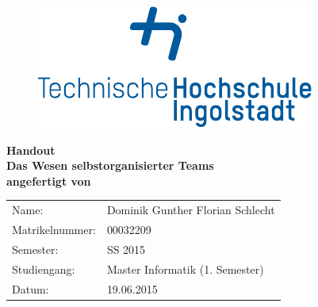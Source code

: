 

\phantom{tmpText}


\begin{figure}[h!]
\centering
\includegraphics[width=.5\textwidth]{bilder/thi_logo_cropped.pdf}
\end{figure}

  \begin{center}
    
    
    \textbf{{\large Handout} \\[3ex]
    {\LARGE Das Wesen selbstorganisierter Teams} \\[1ex]
    angefertigt von} \\
    \begin{tabular}{ll}
    	Name: & Dominik Gunther Florian Schlecht\\
    	Matrikelnummer: & 00032209\\
    	Semester: & SS 2015\\
    	Studiengang: & Master Informatik (1. Semester)\\
    	Datum: & 19.06.2015\\[2ex]
    \end{tabular}\\[5ex] %
  \end{center}
